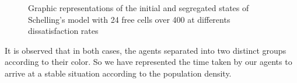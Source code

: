 \documentclass[a4paper, 12pt]{report}
\begin{document}
\begin{figure}[!h]
	\centering
	\caption{Graphic representations of the initial and segregated states of Schelling's model with 24 free cells over 400 at differents dissatisfaction rates}

\end{figure}

\newpage

It is observed that in both cases, the agents separated into two distinct groups according to their color. So we have
represented the time taken by our agents to arrive at a stable situation according to the population density.
\end{document}
